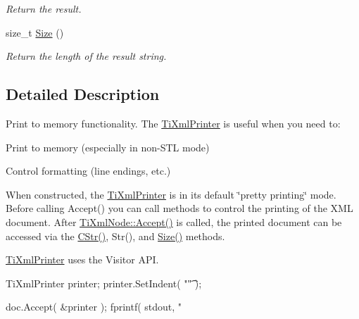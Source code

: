 \begin{DoxyCompactItemize}
\begin{DoxyCompactList}\small\item\em Return the result. \end{DoxyCompactList}\item 
\hypertarget{class_ti_xml_printer_ad01375ae9199bd2f48252eaddce3039d}{size\+\_\+t \hyperlink{class_ti_xml_printer_ad01375ae9199bd2f48252eaddce3039d}{Size} ()}\label{class_ti_xml_printer_ad01375ae9199bd2f48252eaddce3039d}

\begin{DoxyCompactList}\small\item\em Return the length of the result string. \end{DoxyCompactList}\end{DoxyCompactItemize}


\subsection{Detailed Description}
Print to memory functionality. The \hyperlink{class_ti_xml_printer}{Ti\+Xml\+Printer} is useful when you need to\+:


\begin{DoxyEnumerate}
\item Print to memory (especially in non-\/\+S\+T\+L mode)
\item Control formatting (line endings, etc.)
\end{DoxyEnumerate}

When constructed, the \hyperlink{class_ti_xml_printer}{Ti\+Xml\+Printer} is in its default \char`\"{}pretty printing\char`\"{} mode. Before calling Accept() you can call methods to control the printing of the X\+M\+L document. After \hyperlink{class_ti_xml_node_acc0f88b7462c6cb73809d410a4f5bb86}{Ti\+Xml\+Node\+::\+Accept()} is called, the printed document can be accessed via the \hyperlink{class_ti_xml_printer_a859eede9597d3e0355b77757be48735e}{C\+Str()}, Str(), and \hyperlink{class_ti_xml_printer_ad01375ae9199bd2f48252eaddce3039d}{Size()} methods.

\hyperlink{class_ti_xml_printer}{Ti\+Xml\+Printer} uses the Visitor A\+P\+I. \begin{DoxyVerb}TiXmlPrinter printer;
printer.SetIndent( "\t" );

doc.Accept( &printer );
fprintf( stdout, "%
\end{DoxyVerb}
 

